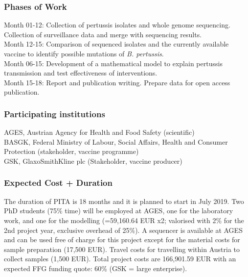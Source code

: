 \documentclass[10pt,a4paper]{article}\usepackage[]{graphicx}\usepackage[]{color}
\begin{document}
\subsubsection*{Phases of Work}
Month 01-12: Collection of pertussis isolates and whole genome sequencing. Collection of surveillance data and merge with sequencing results.\\
Month 12-15: Comparison of sequenced isolates and the currently available vaccine to identify possible mutations of \textit{B. pertussis}.\\
Month 06-15: Development of a mathematical model to explain pertussis transmission and test effectiveness of interventions.\\
Month 15-18: Report and publication writing. Prepare data for open access publication.

\subsubsection*{Participating institutions}
AGES, Austrian Agency for Health and Food Safety (scientific)\\
BASGK, Federal Ministry of Labour, Social Affairs, Health and Consumer Protection (stakeholder, vaccine programme)\\
GSK, GlaxoSmithKline plc (Stakeholder, vaccine producer)

\subsubsection*{Expected Cost + Duration}
The duration of PITA is 18 months and it is planned to start in July 2019. Two PhD students (75\% time) will be employed at AGES, one for the laboratory work, and one for the modelling (=59,160.64 EUR x2; valorised with 2\% for the 2nd project year, exclusive overhead of 25\%). A sequencer is available at AGES and can be used free of charge for this project except for the material costs for sample preparation (17,500 EUR). Travel costs for travelling within Austria to collect samples (1,500 EUR). Total project costs are 166,901.59 EUR with an expected FFG funding quote: 60\% (GSK = large enterprise).
\end{document}
